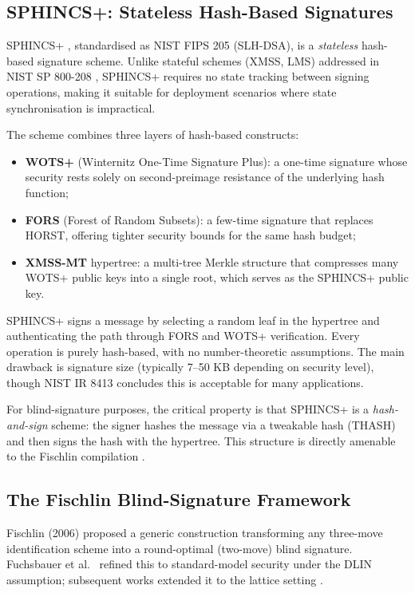 \documentclass[11pt,a4paper]{article}
\begin{document}
\subsection{SPHINCS+: Stateless Hash-Based Signatures}

SPHINCS+ \cite{Bernstein2019SPHINCS}, standardised as NIST FIPS 205 (SLH-DSA), is a
\emph{stateless} hash-based signature scheme.  Unlike stateful schemes (XMSS, LMS) addressed in
NIST SP 800-208 \cite{NIST2020SP800}, SPHINCS+ requires no state tracking between signing
operations, making it suitable for deployment scenarios where state synchronisation is
impractical.

The scheme combines three layers of hash-based constructs:
\begin{itemize}
  \item \textbf{WOTS+} (Winternitz One-Time Signature Plus): a one-time signature whose security
        rests solely on second-preimage resistance of the underlying hash function;
  \item \textbf{FORS} (Forest of Random Subsets): a few-time signature that replaces HORST,
        offering tighter security bounds for the same hash budget;
  \item \textbf{XMSS-MT} hypertree: a multi-tree Merkle structure that compresses many WOTS+
        public keys into a single root, which serves as the SPHINCS+ public key.
\end{itemize}

SPHINCS+ signs a message by selecting a random leaf in the hypertree and authenticating the path
through FORS and WOTS+ verification.  Every operation is purely hash-based, with no
number-theoretic assumptions.  The main drawback is signature size (typically 7--50 KB depending
on security level), though NIST IR 8413 \cite{NIST2022IR8413} concludes this is acceptable for
many applications.

For blind-signature purposes, the critical property is that SPHINCS+ is a \emph{hash-and-sign}
scheme: the signer hashes the message via a tweakable hash (THASH) and then signs the hash
with the hypertree.  This structure is directly amenable to the Fischlin compilation
\cite{Bouillaguet2026BlindingPH}.

\subsection{The Fischlin Blind-Signature Framework}

Fischlin (2006) proposed a generic construction transforming any three-move identification scheme
into a round-optimal (two-move) blind signature.  Fuchsbauer et al.~\cite{Fuchsbauer2015Practical}
refined this to standard-model security under the DLIN assumption; subsequent works extended it
to the lattice setting \cite{delPino2022Framework,Kastner2024PairingFree}.
\end{document}
